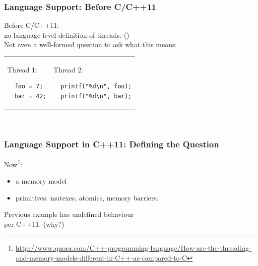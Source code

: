\documentclass[aspectratio=43]{beamer}
\newenvironment{changemargin}[1]{%
  \begin{list}{}{%
    \setlength{\topsep}{0pt}%
    \setlength{\leftmargin}{#1}%
    \setlength{\rightmargin}{1em}
    \setlength{\listparindent}{\parindent}%
    \setlength{\itemindent}{\parindent}%
    \setlength{\parsep}{\parskip}%
  }%
  \item[]}{\end{list}}
\begin{document}
\begin{frame}[fragile]
  \frametitle{Language Support: Before C/C++11}


  \begin{changemargin}{1.5cm}
    Before C/C++11: \\ \qquad no language-level definition of threads. (\textinterrobang)\\[1em]

    Not even a well-formed question to ask what this means:\\[.5em]
    \begin{tabular}{ll}
      \begin{minipage}{.2\textwidth}
        Thread 1:
        \begin{lstlisting}
  foo = 7;
  bar = 42;
        \end{lstlisting}
      \end{minipage} &
      \begin{minipage}{.4\textwidth}
        Thread 2:
        \begin{lstlisting}
  printf("%d\n", foo);
  printf("%d\n", bar);
        \end{lstlisting}
      \end{minipage}
    \end{tabular}
    ~\\[1em]
    
  \end{changemargin}
\end{frame}

\begin{frame}
  \frametitle{Language Support in C++11: Defining the Question}

  \begin{changemargin}{1.5cm}

    Now\footnote{\url{http://www.quora.com/C++-programming-language/How-are-the-threading-and-memory-models-different-in-C++-as-compared-to-C}}:
    \begin{itemize}
    \item a memory model
    \item primitives: mutexes, atomics, memory barriers.
    \end{itemize}

    Previous example has undefined behaviour \\ \qquad per C++11. (why?)
  \end{changemargin}
\end{frame}
\end{document}
